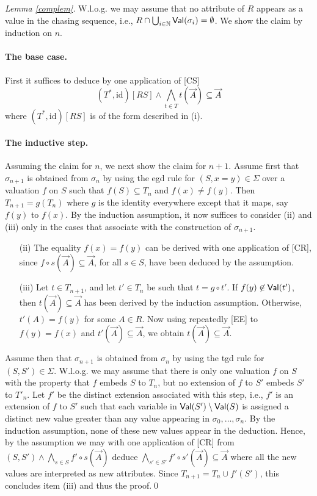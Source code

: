 \documentclass[envcountset]{llncs}
\newcommand{\problemFont}[1]{\protect\ensuremath{\mathsf{#1}}}
\newcommand{\si}{\sigma}
\newcommand{\Si}{\Sigma}
\newcommand{\sub}{\subseteq}
\newcommand{\tuple}[1]{\vec{#1}}
\newcommand{\N}{\mathbb{N}}
\newcommand{\ja}{\wedge}
\newcommand{\Val}{\problemFont{Val}}
\newcommand{\id}{\mathrm{id}}
\begin{document}
\begin{proof}[Lemma \ref{complem}]
W.l.o.g. we may assume that no attribute of $R$ appears as a value in the  chasing sequence, i.e., $R\cap \bigcup_{i\in\N} \Val(\si_i)=\emptyset$. We show the claim by induction on $n$. 
\paragraph{\textbf{The base case.}} First it suffices to deduce by one application of [CS] 
$$(T^*,\id)[RS]\ja \bigwedge_{t\in T}  t(\tuple A) \sub \tuple A$$ where $(T^*,\id)[RS]$ is of the form described in (i).

\paragraph{\textbf{The inductive step.}} Assuming the claim for $n$, we next show the claim for $n+1$.  Assume first that $\si_{n+1}$ is obtained from $\si_n$ by using the egd rule for  $(S,x=y)\in \Si$  over a valuation $f$ on $S$  such that $f(S)\sub T_n$ and $f(x) \neq f(y)$. Then $T_{n+1}= g(T_n)$ where $g$ is the identity everywhere except that it maps, say $f(y)$ to $f(x)$. 
By the induction assumption, it now suffices to consider  (ii) and (iii) only in the cases that associate with the construction of $\si_{n+1}$. 
\begin{itemize}
\item[(ii)]   The  equality $f(x)=f(y)$ can be derived with one application of [CR], since $f\circ s(\tuple A) \sub \tuple A$, for all $s\in S$, have been deduced by the assumption.
\item[(iii)] Let $t\in T_{n+1}$, and let $t'\in T_{n}$ be such that $t=g\circ t'$. If $f(y)\not\in\Val(t')$, then $t(\tuple A) \sub \tuple A$ has been derived by the induction assumption. Otherwise, $t'(A)=f(y)$ for some $A \in R$. Now  using repeatedly [EE] to $ f(y) = f(x)$ and $t'(\tuple A) \sub \tuple A$, we obtain $t(\tuple A) \sub \tuple A$.
\end{itemize}


Assume then that $\si_{n+1}$ is obtained from $\si_n$ by using the tgd rule for  $(S,S')\in \Si$.  W.l.o.g. we may assume that there is only one valuation  $f$ on $S$ with the property that $f$ embeds $S$ to $T_n$, but no extension of $f$ to $S'$  embeds $S'$ to $T'_n$. Let $f'$ be the distinct extension associated with this step, i.e., $f'$ is an extension of $f$ to $S'$ such that each variable in $\Val(S') \setminus \Val(S)$ is assigned a distinct new value greater than any value appearing in $\si_0, \ldots ,\si_n$. By the induction assumption, none of these new values appear in the deduction. Hence, by the assumption we may with one application of [CR] from $(S,S')\wedge \bigwedge_{s\in S} f'\circ s(\tuple A)$ deduce $\bigwedge_{s'\in S'} f'\circ s' (\tuple A) \sub \tuple A$ where all the new values are interpreted as new attributes. Since $T_{n+1} = T_n\cup f'(S')$, this concludes item (iii) and thus the proof.\qed

\end{proof}
\end{document}
